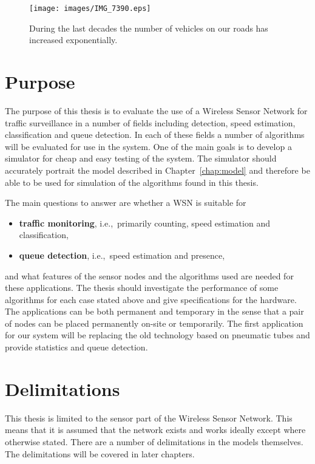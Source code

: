 \begin{figure}[pht]
 \centering
 \texttt{[image: images/IMG\_7390.eps]}
 \caption[Traffic has increased exponentially]{During the last decades the number of vehicles on our roads has increased exponentially.}
 \label{fig:traffic}
\end{figure}

\section{Purpose} %

The purpose of this thesis is to evaluate the use of a Wireless Sensor Network for traffic surveillance in a number of fields including detection, speed estimation, classification and queue detection. In each of these fields a number of algorithms will be evaluated for use in the system. One of the main goals is to develop a simulator for cheap and easy testing of the system. The simulator should accurately portrait the model described in Chapter~\ref{chap:model} and therefore be able to be used for simulation of the algorithms found in this thesis.

The main questions to answer are whether a WSN is suitable for 
\begin{itemize}
	\item \textbf{traffic monitoring}, i.e.,~primarily counting, speed estimation and classification,
	\item \textbf{queue detection}, i.e.,~speed estimation and presence,
\end{itemize}
and what features of the sensor nodes and the algorithms used are needed for these applications. The thesis should investigate the performance of some algorithms for each case stated above and give specifications for the hardware. The applications can be both permanent and temporary in the sense that a pair of nodes can be placed permanently on-site or temporarily. The first application for our system will be replacing the old technology based on pneumatic tubes and provide statistics and queue detection.

\section{Delimitations} %

This thesis is limited to the sensor part of the Wireless Sensor Network. This means that it is assumed that the network exists and works ideally except where otherwise stated. There are a number of delimitations in the models themselves. The delimitations will be covered in later chapters.
